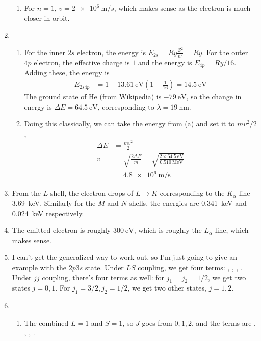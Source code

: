 \documentclass{homework}
\begin{document}
\begin{enumerate}
\begin{enumerate}
			\item For $n=1$, $v = \SI{2e6}{\m/s}$, which makes sense as the electron is much closer in orbit.
			
		\end{enumerate}
		
		\item \begin{enumerate}
			\item For the inner $2s$ electron, the energy is $E_{2s} = Ry \frac{Z^2}{n^2} = Ry$. For the outer $4p$ electron, the effective charge is $1$ and the energy is $E_{4p} = Ry / 16$. Adding these, the energy is \begin{align*}
				E_{2s4p} & = 1 + \SI{13.61}{\eV} \left(1 + \frac{1}{16} \right) = \SI{14.5}{\eV}
			\end{align*}
			The ground state of He (from Wikipedia) is $-\SI{79}{\eV}$, so the change in energy is $\Delta E = \SI{64.5}{\eV}$, corresponding to $\lambda = \SI{19}{\nm}$.
			
			\item Doing this classically, we can take the energy from (a) and set it to $mv^2 / 2$, \begin{align*}
				\Delta E & = \frac{mv^2}{2} \\
				v & = \sqrt{\frac{ 2 \Delta E}{m}} = \sqrt{\frac{2 \times \SI{64.5}{\eV}}{\SI{0.510}{\MeV}}} \\
					& = \SI{4.8e6}{\m\per\s}
			\end{align*}
		\end{enumerate}
	
		\item From the $L$ shell, the electron drops of $L \to K$ corresponding to the $K_\alpha$ line \SI{3.69}{\keV}. Similarly for the $M$ and $N$ shells, the energies are \SI{0.341}{\keV} and \SI{0.024}{\keV} respectively.
		
		\item The emitted electron is roughly $\SI{300}{\eV}$, which is roughly the $L_\alpha$ line, which makes sense.
		
		\item I can't get the generalized way to work out, so I'm just going to give an example with the $2p3s$ state. Under $LS$ coupling, we get four terms: , , , . Under $jj$ coupling, there's four terms as well: for $j_1 = j_2 = 1/2$, we get two states $j=0, 1$. For $j_1 = 3/2, j_2 = 1/2$, we get two other states, $j=1, 2$.
		
		\item \begin{enumerate}
			\item The combined $L=1$ and $S=1$, so $J$ goes from $0, 1, 2$, and the terms are , , , .
			

\end{enumerate}
\end{enumerate}
\end{document}
